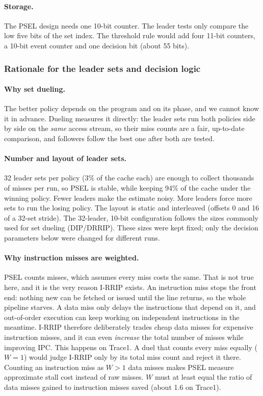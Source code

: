 \documentclass[11pt,a4paper]{article}
\begin{document}
\paragraph{Storage.} The PSEL design needs one 10-bit counter. The leader tests only compare the low five bits of the
set index. The threshold rule would add four 11-bit counters, a 10-bit event counter and one decision bit (about 55 bits).

\subsubsection{Rationale for the leader sets and decision logic}

\paragraph{Why set dueling.} The better policy depends on the program and on its phase, and we cannot know it in
advance. Dueling measures it directly: the leader sets run both policies side by side on the \emph{same} access stream,
so their miss counts are a fair, up-to-date comparison, and followers follow the best one after both are tested.

\paragraph{Number and layout of leader sets.} 32 leader sets per policy (3\% of the cache each) are enough to collect
thousands of misses per run, so PSEL is stable, while keeping 94\% of the cache under the winning policy. Fewer leaders
make the estimate noisy. More leaders force more sets to run the losing policy. The layout is static and interleaved
(offsets 0 and 16 of a 32-set stride). The 32-leader, 10-bit configuration follows the
sizes commonly used for set dueling (DIP/DRRIP).
These sizes were kept fixed; only the decision parameters below were changed for different runs.

\paragraph{Why instruction misses are weighted.} PSEL counts misses, which assumes every miss costs the same. That is not true
here, and it is the very reason I-RRIP exists. An instruction miss stops the front end: nothing new can be fetched or
issued until the line returns, so the whole pipeline starves. A data miss only delays the instructions that depend on it, and
out-of-order execution can keep working on independent instructions in the meantime. I-RRIP therefore deliberately trades
cheap data misses for expensive instruction misses, and it can even \emph{increase} the total number of misses while
improving IPC. This happens on Trace1. A duel that counts every miss equally ($W=1$) would judge I-RRIP only by its total miss count and
reject it there. Counting an instruction miss as $W>1$ data misses makes PSEL measure approximate stall cost
instead of raw misses. $W$ must at least equal the ratio of data misses gained to instruction misses saved
(about 1.6 on Trace1).
\end{document}

